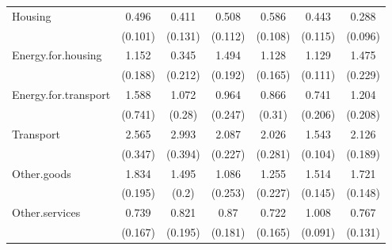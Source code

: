 \begin{tabular}{lcccccc}
  Housing & 0.496 & 0.411 & 0.508 & 0.586 & 0.443 & 0.288 \\ 
   & (0.101) & (0.131) & (0.112) & (0.108) & (0.115) & (0.096) \\ 
  Energy.for.housing & 1.152 & 0.345 & 1.494 & 1.128 & 1.129 & 1.475 \\ 
   & (0.188) & (0.212) & (0.192) & (0.165) & (0.111) & (0.229) \\ 
  Energy.for.transport & 1.588 & 1.072 & 0.964 & 0.866 & 0.741 & 1.204 \\ 
   & (0.741) & (0.28) & (0.247) & (0.31) & (0.206) & (0.208) \\ 
  Transport & 2.565 & 2.993 & 2.087 & 2.026 & 1.543 & 2.126 \\ 
   & (0.347) & (0.394) & (0.227) & (0.281) & (0.104) & (0.189) \\ 
  Other.goods & 1.834 & 1.495 & 1.086 & 1.255 & 1.514 & 1.721 \\ 
   & (0.195) & (0.2) & (0.253) & (0.227) & (0.145) & (0.148) \\ 
  Other.services & 0.739 & 0.821 & 0.87 & 0.722 & 1.008 & 0.767 \\ 
   & (0.167) & (0.195) & (0.181) & (0.165) & (0.091) & (0.131) \\ 
   \hline
\end{tabular}